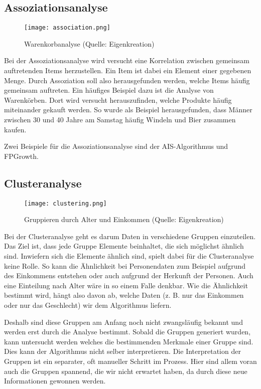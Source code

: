 \subsection{Assoziationsanalyse}
\begin{figure}[h!]
	\centering
	\texttt{[image: association.png]}
	\caption{Warenkorbanalyse (Quelle: Eigenkreation)}
\end{figure}
Bei der Assoziationsanalyse wird versucht eine Korrelation zwischen gemeinsam auftretenden Items herzustellen.
Ein Item ist dabei ein Element einer gegebenen Menge. Durch Assoziation soll also herausgefunden werden, welche Items häufig gemeinsam auftreten. Ein häufiges Beispiel dazu ist die Analyse von Warenkörben. Dort wird versucht herauszufinden, welche Produkte häufig miteinander gekauft werden. So wurde als Beispiel herausgefunden, dass Männer zwischen 30 und 40 Jahre am Samstag häufig Windeln und Bier zusammen kaufen.

Zwei Beispiele für die Assoziationsanalyse sind der AIS-Algorithmus und FPGrowth.

\subsection{Clusteranalyse}
\label{sec:clustering}
\begin{figure}[h!]
	\centering
	\texttt{[image: clustering.png]}
	\caption{Gruppieren durch Alter und Einkommen (Quelle: Eigenkreation)}
\end{figure}
Bei der Clusteranalyse geht es darum Daten in verschiedene Gruppen einzuteilen. Das Ziel ist, dass jede Gruppe Elemente beinhaltet, die sich möglichst ähnlich sind. Inwiefern sich die Elemente ähnlich sind, spielt dabei für die Clusteranalyse keine Rolle. So kann die Ähnlichkeit bei Personendaten zum Beispiel aufgrund des Einkommens entstehen oder auch aufgrund der Herkunft der Personen. Auch eine Einteilung nach Alter wäre in so einem Falle denkbar. Wie die Ähnlichkeit bestimmt wird, hängt also davon ab, welche Daten (z. B. nur das Einkommen oder nur das Geschlecht) wir dem Algorithmus liefern.

Deshalb sind diese Gruppen am Anfang noch nicht zwangsläufig bekannt und werden erst durch die Analyse bestimmt. Sobald die Gruppen generiert wurden, kann untersucht werden welches die bestimmenden Merkmale einer Gruppe sind. Dies kann der Algorithmus nicht selber interpretieren. Die Interpretation der Gruppen ist ein separater, oft manueller Schritt im Prozess. Hier sind allem voran auch die Gruppen spannend, die wir nicht erwartet haben, da durch diese neue Informationen gewonnen werden. 

